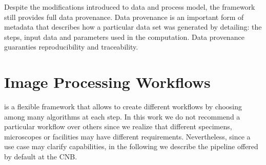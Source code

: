 Despite the modifications introduced to \scipion data and process model, the framework still provides full data provenance. Data provenance is an important form of metadata that describes how a particular data set was generated by detailing: the steps, input data and parameters used in the computation. Data provenance guaranties reproducibility and traceability. %



\section{Image Processing Workflows}

\scipion is a flexible framework that allows to create different workflows by choosing among many algorithms at each step. In this work we do not recommend a particular workflow  over others since we realize that different specimens, microscopes or facilities may have different requirements. Nevertheless, since a use case may clarify \scipion capabilities, in the following we describe the pipeline offered by default at the CNB.

